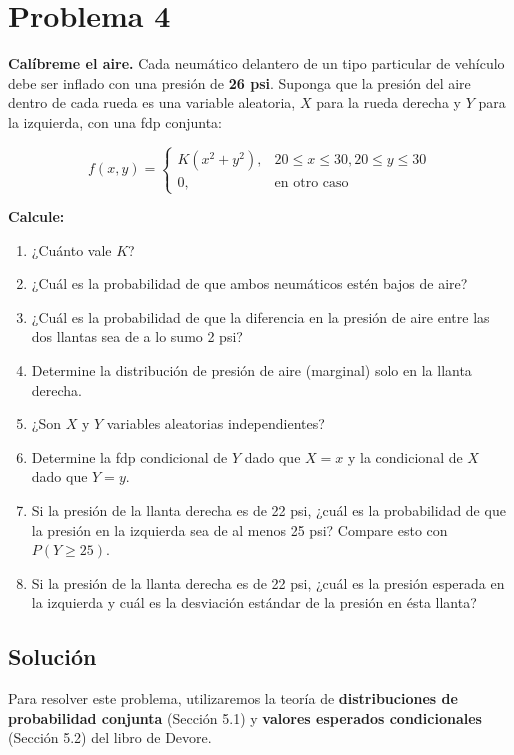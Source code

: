 \documentclass[a4paper]{article}
\begin{document}
\section{Problema 4}
\textbf{Calíbreme el aire.} Cada neumático delantero de un tipo particular de vehículo debe ser inflado con una presión de \textbf{26 psi}. Suponga que la presión del aire dentro de cada rueda es una variable aleatoria, $X$ para la rueda derecha y $Y$ para la izquierda, con una fdp conjunta:

$$f(x,y)=
\begin{cases}
K(x^2 + y^2), & 20 \le x \le 30, 20 \le y \le 30 \\
0, & \text{en otro caso}
\end{cases}$$

\textbf{Calcule:}
\begin{enumerate}
    \item[a)] ¿Cuánto vale $K$?
    \item[b)] ¿Cuál es la probabilidad de que ambos neumáticos estén bajos de aire?
    \item[c)] ¿Cuál es la probabilidad de que la diferencia en la presión de aire entre las dos llantas sea de a lo sumo 2 psi?
    \item[d)] Determine la distribución de presión de aire (marginal) solo en la llanta derecha.
    \item[e)] ¿Son $X$ y $Y$ variables aleatorias independientes?
    \item[f)] Determine la fdp condicional de $Y$ dado que $X = x$ y la condicional de $X$ dado que $Y = y$.
    \item[g)] Si la presión de la llanta derecha es de 22 psi, ¿cuál es la probabilidad de que la presión en la izquierda sea de al menos 25 psi? Compare esto con $P(Y \ge 25)$.
    \item[h)] Si la presión de la llanta derecha es de 22 psi, ¿cuál es la presión esperada en la izquierda y cuál es la desviación estándar de la presión en ésta llanta?
\end{enumerate}

\subsection{Solución}

Para resolver este problema, utilizaremos la teoría de \textbf{distribuciones de probabilidad conjunta} (Sección 5.1) y \textbf{valores esperados condicionales} (Sección 5.2) del libro de Devore.
\end{document}
